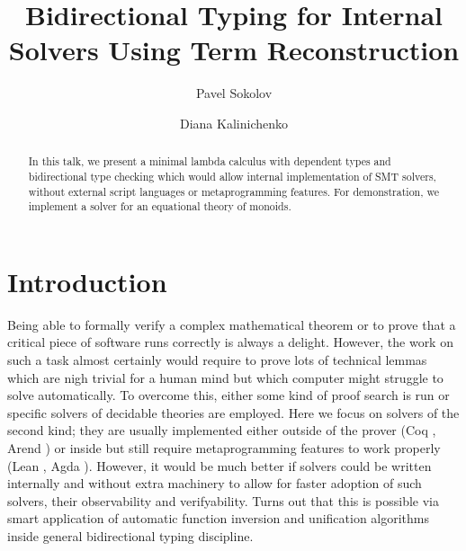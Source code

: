 \documentclass[manuscript,screen,review]{acmart}
\begin{document}
\title{Bidirectional Typing for Internal Solvers Using Term Reconstruction}

\author{Pavel Sokolov}

\author{Diana Kalinichenko}

\begin{abstract}
  In this talk, we present a minimal lambda calculus with dependent types and
  bidirectional type checking which would allow internal implementation of
  SMT solvers, without external script languages or meta\-programming features.
  For demonstration, we implement a solver for an equational theory of monoids.
\end{abstract}


\maketitle

\section{Introduction}

Being able to formally verify a complex mathematical theorem or to prove that a
critical piece of software runs correctly is always a delight. However, the work
on such a task almost certainly would require to prove lots of technical lemmas
which are nigh trivial for a human mind but which computer might struggle to
solve automatically. To overcome this, either some kind of proof search is run
or specific solvers of decidable theories are employed. Here we focus on solvers
of the second kind; they are usually implemented either outside of the prover
(Coq \cite{coq}, Arend \cite{arend}) or inside but still require metaprogramming
features to work properly (Lean \cite{lean}, Agda \cite{agda}). However, it
would be much better if solvers could be written internally and without extra
machinery to allow for faster adoption of such solvers, their observability and
verifyability. Turns out that this is possible via smart application of
automatic function inversion and unification algorithms inside general
bidirectional typing discipline.
\end{document}
